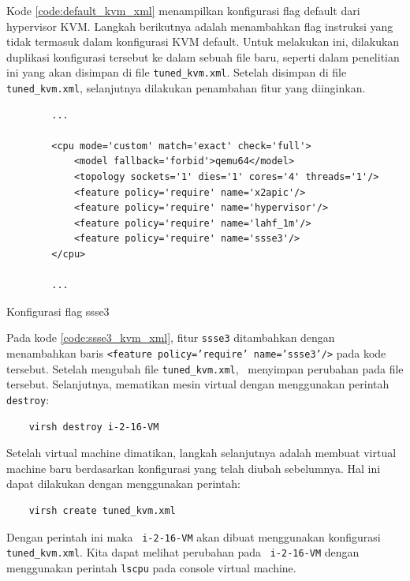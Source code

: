 Kode \ref{code:default_kvm_xml} menampilkan konfigurasi flag default dari hypervisor KVM. Langkah berikutnya adalah menambahkan flag instruksi yang tidak termasuk dalam konfigurasi KVM default. Untuk melakukan ini, dilakukan duplikasi konfigurasi tersebut ke dalam sebuah file baru, seperti dalam penelitian ini yang akan disimpan di file \texttt{tuned\_kvm.xml}. Setelah disimpan di file \texttt{tuned\_kvm.xml}, selanjutnya dilakukan penambahan fitur yang diinginkan.

\begin{listing}[H]
    \begin{verbatim}
        ...

        <cpu mode='custom' match='exact' check='full'>
            <model fallback='forbid'>qemu64</model>
            <topology sockets='1' dies='1' cores='4' threads='1'/>
            <feature policy='require' name='x2apic'/>
            <feature policy='require' name='hypervisor'/> 
            <feature policy='require' name='lahf_1m'/>
            <feature policy='require' name='ssse3'/>
        </cpu>
        
        ...
    \end{verbatim}
    \caption{Konfigurasi flag ssse3}
    \label{code:ssse3_kvm_xml}
\end{listing}

Pada kode \ref{code:ssse3_kvm_xml}, fitur \texttt{ssse3} ditambahkan dengan menambahkan baris \texttt{<feature policy='require' name='ssse3'/>} pada kode tersebut. Setelah mengubah file \texttt{tuned\_kvm.xml}, \saya\ menyimpan perubahan pada file tersebut. Selanjutnya, mematikan mesin virtual dengan menggunakan perintah \texttt{destroy}:

\begin{lstlisting}
    virsh destroy i-2-16-VM
\end{lstlisting}

Setelah virtual machine dimatikan, langkah selanjutnya adalah membuat virtual machine baru berdasarkan konfigurasi yang telah diubah sebelumnya. Hal ini dapat dilakukan dengan menggunakan perintah:

\begin{lstlisting}
    virsh create tuned_kvm.xml
\end{lstlisting}

Dengan perintah ini maka \vm\ \texttt{i-2-16-VM} akan dibuat menggunakan konfigurasi \texttt{tuned\_kvm.xml}. Kita dapat melihat perubahan pada \vm\ \texttt{i-2-16-VM} dengan menggunakan perintah \texttt{lscpu} pada console virtual machine.

